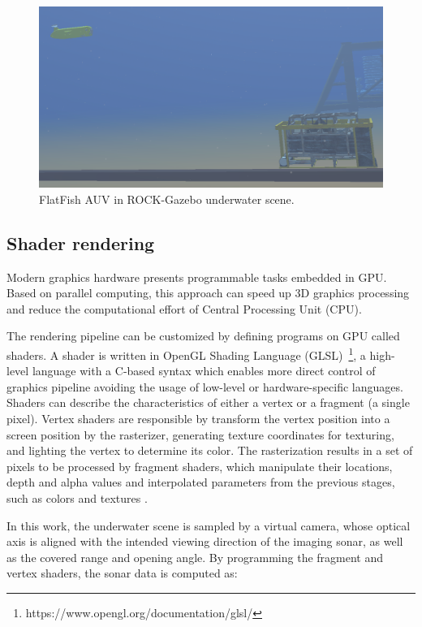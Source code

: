 \documentclass[final,5p,times]{elsarticle}
\begin{document}
\begin{figure}[!h]
    \includegraphics[width=\columnwidth]{figs/uwscene2}
    \centering
    \captionsetup{justification=centering}
    \caption{FlatFish AUV in ROCK-Gazebo underwater scene.}
    \label{fig:uwscene}
\end{figure}


\subsection{Shader rendering}
\label{dev:shader}

Modern graphics hardware presents programmable tasks embedded in GPU. Based on parallel computing, this approach can speed up 3D graphics processing and reduce the computational effort of Central Processing Unit (CPU).

The rendering pipeline can be customized by defining programs on GPU called shaders. A shader is written in OpenGL Shading Language (GLSL)~\footnote{https://www.opengl.org/documentation/glsl/}, a high-level language with a C-based syntax which enables more direct control of graphics pipeline avoiding the usage of low-level or hardware-specific languages. Shaders can describe the characteristics of either a vertex or a fragment (a single pixel). Vertex shaders are responsible by transform the vertex position into a screen position by the rasterizer, generating texture coordinates for texturing, and lighting the vertex to determine its color. The rasterization results in a set of pixels to be processed by fragment shaders, which manipulate their locations, depth and alpha values and interpolated parameters from the previous stages, such as colors and textures \cite{fernando2003}.

In this work, the underwater scene is sampled by a virtual camera, whose optical axis is aligned with the intended viewing direction of the imaging sonar, as well as the covered range and opening angle. By programming the fragment and vertex shaders, the sonar data is computed as:
\end{document}
